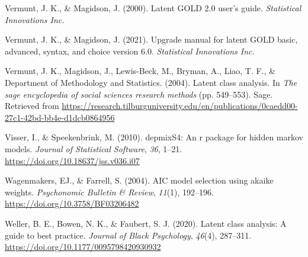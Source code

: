 \documentclass[
  ,man,floatsintext]{apa6}
\newlength{\cslhangindent}
\newlength{\cslentryspacingunit} %
\newenvironment{CSLReferences}[2] %
 {%
  \setlength{\parindent}{0pt}
  \ifodd #1
  \let\oldpar\par
  \def\par{\hangindent=\cslhangindent\oldpar}
  \fi
  \setlength{\parskip}{#2\cslentryspacingunit}
 }%
 {}
\begin{document}
\begin{CSLReferences}{1}{0}
\leavevmode{}%
Vermunt, J. K., \& Magidson, J. (2000). Latent {GOLD} 2.0 user's guide. \emph{Statistical Innovations Inc.}

\leavevmode{}%
Vermunt, J. K., \& Magidson, J. (2021). Upgrade manual for latent {GOLD} basic, advanced, syntax, and choice version 6.0. \emph{Statistical Innovations Inc.}

\leavevmode{}%
Vermunt, J. K., Magidson, J., Lewis-Beck, M., Bryman, A., Liao, T. F., \& Department of Methodology and Statistics. (2004). Latent class analysis. In \emph{The sage encyclopedia of social sciences research methods} (pp. 549--553). Sage. Retrieved from \url{https://research.tilburguniversity.edu/en/publications/0caedd00-27c1-42bd-bb4e-d1dcb0864956}

\leavevmode{}%
Visser, I., \& Speekenbrink, M. (2010). {depmixS}4: An r package for hidden markov models. \emph{Journal of Statistical Software}, \emph{36}, 1--21. \url{https://doi.org/10.18637/jss.v036.i07}

\leavevmode{}%
Wagenmakers, EJ., \& Farrell, S. (2004). {AIC} model selection using akaike weights. \emph{Psychonomic Bulletin \& Review}, \emph{11}(1), 192--196. \url{https://doi.org/10.3758/BF03206482}

\leavevmode{}%
Weller, B. E., Bowen, N. K., \& Faubert, S. J. (2020). Latent class analysis: A guide to best practice. \emph{Journal of Black Psychology}, \emph{46}(4), 287--311. \url{https://doi.org/10.1177/0095798420930932}

\end{CSLReferences}
\end{document}
